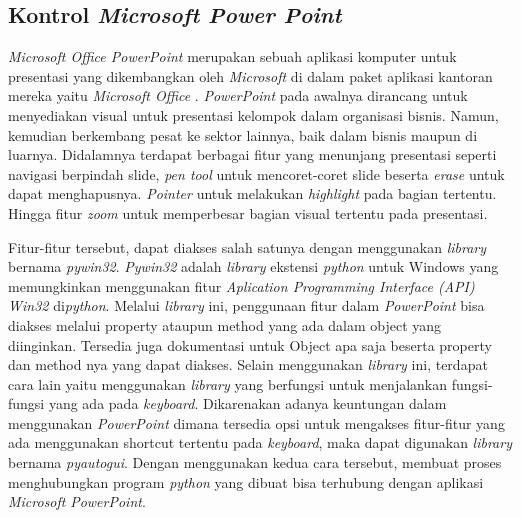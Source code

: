 \subsection{Kontrol \emph{Microsoft Power Point}}
\emph{Microsoft Office PowerPoint} merupakan sebuah aplikasi komputer untuk presentasi yang dikembangkan oleh \emph{\emph{Microsoft}} di dalam paket aplikasi kantoran mereka yaitu \emph{Microsoft Office} \parencite{Poerwanti2018}. \emph{PowerPoint} pada awalnya dirancang untuk menyediakan visual untuk presentasi kelompok dalam organisasi bisnis. Namun, kemudian berkembang pesat ke sektor lainnya, baik dalam bisnis maupun di luarnya. Didalamnya terdapat berbagai fitur yang menunjang presentasi seperti navigasi berpindah slide, \emph{pen tool} untuk mencoret-coret slide beserta \emph{erase} untuk dapat menghapusnya. \emph{Pointer} untuk melakukan \emph{highlight} pada bagian tertentu. Hingga fitur \emph{zoom} untuk memperbesar bagian visual tertentu pada presentasi.

Fitur-fitur tersebut, dapat diakses salah satunya dengan menggunakan \emph{library} bernama \emph{pywin32}. \emph{Pywin32} adalah \emph{library} ekstensi \emph{python} untuk Windows yang memungkinkan menggunakan fitur \emph{Aplication Programming Interface (API) Win32} di\emph{python}. Melalui \emph{library} ini, penggunaan fitur dalam \emph{PowerPoint} bisa diakses melalui property ataupun method yang ada dalam object yang diinginkan. Tersedia juga dokumentasi untuk Object apa saja beserta property dan method nya yang dapat diakses. Selain menggunakan \emph{library} ini, terdapat cara lain yaitu menggunakan \emph{library} yang berfungsi untuk menjalankan fungsi-fungsi yang ada pada \emph{\emph{keyboard}}. Dikarenakan adanya keuntungan dalam menggunakan \emph{PowerPoint} dimana tersedia opsi untuk mengakses fitur-fitur yang ada menggunakan shortcut tertentu pada \emph{keyboard}, maka dapat digunakan \emph{library} bernama \emph{pyautogui}. Dengan menggunakan kedua cara tersebut, membuat proses menghubungkan program \emph{python} yang dibuat bisa terhubung dengan aplikasi \emph{Microsoft} \emph{PowerPoint}.  


